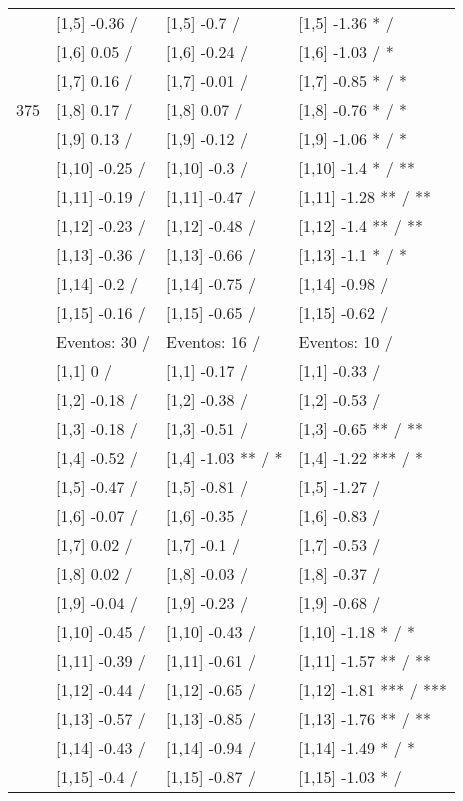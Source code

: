 \begin{table}
\begin{tabular}[t]{llll}
 & {}[1,5] -0.36  / & {}[1,5] -0.7  / & {}[1,5] -1.36 * /\\
 & {}[1,6] 0.05  / & {}[1,6] -0.24  / & {}[1,6] -1.03  / *\\
 & {}[1,7] 0.16  / & {}[1,7] -0.01  / & {}[1,7] -0.85 * / *\\
375 & {}[1,8] 0.17  / & {}[1,8] 0.07  / & {}[1,8] -0.76 * / *\\
\addlinespace
 & {}[1,9] 0.13  / & {}[1,9] -0.12  / & {}[1,9] -1.06 * / *\\
 & {}[1,10] -0.25  / & {}[1,10] -0.3  / & {}[1,10] -1.4 * / **\\
 & {}[1,11] -0.19  / & {}[1,11] -0.47  / & {}[1,11] -1.28 ** / **\\
 & {}[1,12] -0.23  / & {}[1,12] -0.48  / & {}[1,12] -1.4 ** / **\\
 & {}[1,13] -0.36  / & {}[1,13] -0.66  / & {}[1,13] -1.1 * / *\\
\addlinespace
 & {}[1,14] -0.2  / & {}[1,14] -0.75  / & {}[1,14] -0.98  /\\
 & {}[1,15] -0.16  / & {}[1,15] -0.65  / & {}[1,15] -0.62  /\\
 & Eventos:  30 / & Eventos:  16 / & Eventos:  10 /\\
 & {}[1,1] 0  / & {}[1,1] -0.17  / & {}[1,1] -0.33  /\\
 & {}[1,2] -0.18  / & {}[1,2] -0.38  / & {}[1,2] -0.53  /\\
\addlinespace
 & {}[1,3] -0.18  / & {}[1,3] -0.51  / & {}[1,3] -0.65 ** / **\\
 & {}[1,4] -0.52  / & {}[1,4] -1.03 ** / * & {}[1,4] -1.22 *** / *\\
 & {}[1,5] -0.47  / & {}[1,5] -0.81  / & {}[1,5] -1.27  /\\
 & {}[1,6] -0.07  / & {}[1,6] -0.35  / & {}[1,6] -0.83  /\\
 & {}[1,7] 0.02  / & {}[1,7] -0.1  / & {}[1,7] -0.53  /\\
\addlinespace
500 & {}[1,8] 0.02  / & {}[1,8] -0.03  / & {}[1,8] -0.37  /\\
 & {}[1,9] -0.04  / & {}[1,9] -0.23  / & {}[1,9] -0.68  /\\
 & {}[1,10] -0.45  / & {}[1,10] -0.43  / & {}[1,10] -1.18 * / *\\
 & {}[1,11] -0.39  / & {}[1,11] -0.61  / & {}[1,11] -1.57 ** / **\\
 & {}[1,12] -0.44  / & {}[1,12] -0.65  / & {}[1,12] -1.81 *** / ***\\
\addlinespace
 & {}[1,13] -0.57  / & {}[1,13] -0.85  / & {}[1,13] -1.76 ** / **\\
 & {}[1,14] -0.43  / & {}[1,14] -0.94  / & {}[1,14] -1.49 * / *\\
 & {}[1,15] -0.4  / & {}[1,15] -0.87  / & {}[1,15] -1.03 * /\\
\bottomrule
\end{tabular}
\end{table}
